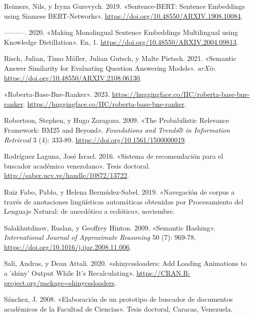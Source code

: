 \documentclass[
  12pt,
  openany]{book}
\newlength{\cslhangindent}
\newlength{\cslentryspacingunit} %
\newenvironment{CSLReferences}[2] %
 {%
  \setlength{\parindent}{0pt}
  \ifodd #1
  \let\oldpar\par
  \def\par{\hangindent=\cslhangindent\oldpar}
  \fi
  \setlength{\parskip}{#2\cslentryspacingunit}
 }%
 {}
\begin{document}
\begin{CSLReferences}{1}{0}
\leavevmode{}%
Reimers, Nils, y Iryna Gurevych. 2019. {«Sentence-BERT: Sentence Embeddings using Siamese BERT-Networks»}. \url{https://doi.org/10.48550/ARXIV.1908.10084}.

\leavevmode{}%
---------. 2020. {«Making Monolingual Sentence Embeddings Multilingual using Knowledge Distillation»}. En, 1. \url{https://doi.org/10.48550/ARXIV.2004.09813}.

\leavevmode{}%
Risch, Julian, Timo Möller, Julian Gutsch, y Malte Pietsch. 2021. {«Semantic Answer Similarity for Evaluating Question Answering Models»}. \emph{arXiv}. \url{https://doi.org/10.48550/ARXIV.2108.06130}.

\leavevmode{}%
{«Roberta-Base-Bne-Ranker»}. 2023. \url{https://huggingface.co/IIC/roberta-base-bne-ranker}. \url{https://huggingface.co/IIC/roberta-base-bne-ranker}.

\leavevmode{}%
Robertson, Stephen, y Hugo Zaragoza. 2009. {«The Probabilistic Relevance Framework: BM25 and Beyond»}. \emph{Foundations and Trends® in Information Retrieval} 3 (4): 333-89. \url{https://doi.org/10.1561/1500000019}.

\leavevmode{}%
Rodríguez Laguna, José Israel. 2016. {«Sistema de recomendación para el buscador académico venezolano»}. Tesis doctoral. \url{http://saber.ucv.ve/handle/10872/13722}.

\leavevmode{}%
Ruiz Fabo, Pablo, y Helena Bermúdez-Sabel. 2019. {«Navegación de corpus a través de anotaciones lingüísticas automáticas obtenidas por Procesamiento del Lenguaje Natural: de anecdótico a ecdótico»}, noviembre.

\leavevmode{}%
Salakhutdinov, Ruslan, y Geoffrey Hinton. 2009. {«Semantic Hashing»}. \emph{International Journal of Approximate Reasoning} 50 (7): 969-78. \url{https://doi.org/10.1016/j.ijar.2008.11.006}.

\leavevmode{}%
Sali, Andras, y Dean Attali. 2020. {«shinycssloaders: Add Loading Animations to a 'shiny' Output While It's Recalculating»}. \url{https://CRAN.R-project.org/package=shinycssloaders}.

\leavevmode{}%
Sánchez, J. 2008. {«Elaboración de un prototipo de buscador de documentos académicos de la Facultad de Ciencias»}. Tesis doctoral, Caracas, Venezuela.


\end{CSLReferences}
\end{document}
